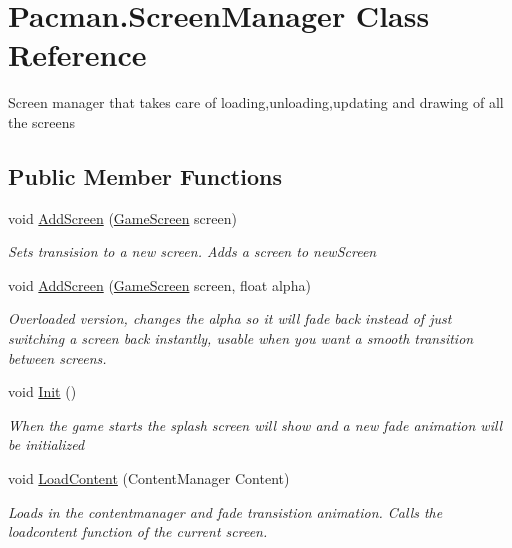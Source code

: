 \hypertarget{class_pacman_1_1_screen_manager}{\section{Pacman.\-Screen\-Manager Class Reference}
\label{class_pacman_1_1_screen_manager}
}


Screen manager that takes care of loading,unloading,updating and drawing of all the screens  


\subsection*{Public Member Functions}
\begin{DoxyCompactItemize}
\item 
void \hyperlink{class_pacman_1_1_screen_manager_a310cc24307ddb1a45dd88e3abc6eafbf}{Add\-Screen} (\hyperlink{class_pacman_1_1_game_screen}{Game\-Screen} screen)
\begin{DoxyCompactList}\small\item\em Sets transision to a new screen. Adds a screen to new\-Screen \end{DoxyCompactList}\item 
void \hyperlink{class_pacman_1_1_screen_manager_ae53ab14c72d98db3b0a92775a24d0cb0}{Add\-Screen} (\hyperlink{class_pacman_1_1_game_screen}{Game\-Screen} screen, float alpha)
\begin{DoxyCompactList}\small\item\em Overloaded version, changes the alpha so it will fade back instead of just switching a screen back instantly, usable when you want a smooth transition between screens. \end{DoxyCompactList}\item 
void \hyperlink{class_pacman_1_1_screen_manager_ababbf590c315370355a1c76e57e61552}{Init} ()
\begin{DoxyCompactList}\small\item\em When the game starts the splash screen will show and a new fade animation will be initialized \end{DoxyCompactList}\item 
void \hyperlink{class_pacman_1_1_screen_manager_ad20ca7f52ff926b637c26d19865f585c}{Load\-Content} (Content\-Manager Content)
\begin{DoxyCompactList}\small\item\em Loads in the contentmanager and fade transistion animation. Calls the loadcontent function of the current screen. \end{DoxyCompactList}\item 

\end{DoxyCompactItemize}
